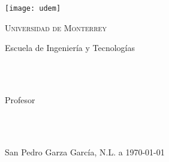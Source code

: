 \begin{titlepage}

\centering

\centerline{\texttt{[image: udem]}}

\vspace*{2\baselineskip}

{\LARGE \scshape Universidad de Monterrey}\\

\vspace*{2\baselineskip}

{Escuela de Ingeniería y Tecnologías}\\
{\myClass}\\

\vspace*{14\baselineskip}

{\LARGE \myTitle}\\[0.5\baselineskip]

\vspace*{6\baselineskip}

{Profesor}\\
{\myProfessor}\\

\vspace*{6\baselineskip}

{\myId \qquad \myName}\\



\vspace*{\fill}

{San Pedro Garza García, N.L. a \today}\\

\end{titlepage}